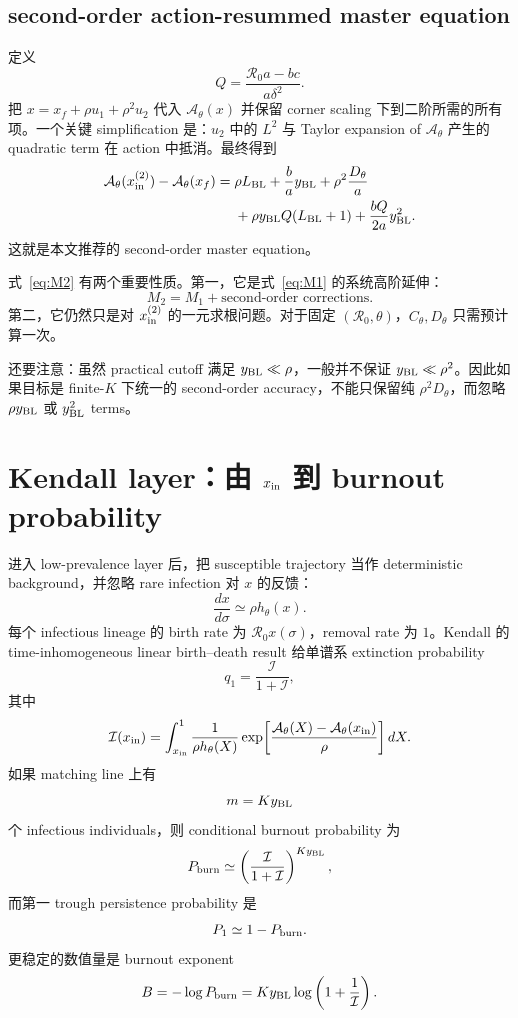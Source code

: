 \documentclass[11pt,a4paper]{ctexart}
\newcommand{\Rzero}{\mathcal R_0}
\newcommand{\Afun}{\mathcal A_\theta}
\newcommand{\BL}{y_{\rm BL}}
\newcommand{\xin}{x_{\rm in}}
\newcommand{\xf}{x_f}
\newcommand{\Pone}{P_1}
\newcommand{\Pburn}{P_{\rm burn}}
\begin{document}
\subsection{second-order action-resummed master equation}
定义
\begin{equation}
\label{eq:Q}
Q=\frac{\Rzero a-bc}{a\delta^2}.
\end{equation}
把 $x=\xf+\rho u_1+\rho^2u_2$ 代入 $\Afun(x)$ 并保留 corner scaling 下到二阶所需的所有项。一个关键 simplification 是：$u_2$ 中的 $L^2$ 与 Taylor expansion of $\Afun$ 产生的 quadratic term 在 action 中抵消。最终得到
\begin{equation}
\label{eq:M2}
\begin{split}
\Afun(x_{\rm in}^{(2)})-\Afun(\xf)
={}&\rho L_{\rm BL}
+\frac ba\BL
+\rho^2\frac{D_\theta}{a}\\
&+\rho\BL Q(L_{\rm BL}+1)
+\frac{bQ}{2a}\BL^2.
\end{split}
\end{equation}
这就是本文推荐的 second-order master equation。

式~\eqref{eq:M2} 有两个重要性质。第一，它是式~\eqref{eq:M1} 的系统高阶延伸：
\[
M_2=M_1+\text{second-order corrections}.
\]
第二，它仍然只是对 $x_{\rm in}^{(2)}$ 的一元求根问题。对于固定 $(\Rzero,\theta)$，$C_\theta,D_\theta$ 只需预计算一次。

还要注意：虽然 practical cutoff 满足 $\BL\ll\rho$，一般并不保证 $\BL\ll\rho^2$。因此如果目标是 finite-$K$ 下统一的 second-order accuracy，不能只保留纯 $\rho^2D_\theta$，而忽略 $\rho\BL$ 或 $\BL^2$ terms。

\section{Kendall layer：由 $x_{\rm in}$ 到 burnout probability}
进入 low-prevalence layer 后，把 susceptible trajectory 当作 deterministic background，并忽略 rare infection 对 $x$ 的反馈：
\[
\frac{dx}{d\sigma}\simeq\rho h_\theta(x).
\]
每个 infectious lineage 的 birth rate 为 $\Rzero x(\sigma)$，removal rate 为 $1$。Kendall 的 time-inhomogeneous linear birth--death result 给单谱系 extinction probability
\begin{equation}
\label{eq:q}
q_1=\frac{\mathcal I}{1+\mathcal I},
\end{equation}
其中
\begin{equation}
\label{eq:Kendall}
\mathcal I(\xin)
=\int_{\xin}^{1}
\frac1{\rho h_\theta(X)}
\exp\!\left[
\frac{\Afun(X)-\Afun(\xin)}{\rho}
\right]dX.
\end{equation}
如果 matching line 上有
\[
m=K\BL
\]
个 infectious individuals，则 conditional burnout probability 为
\begin{equation}
\label{eq:Pburn}
\Pburn
\simeq\left(\frac{\mathcal I}{1+\mathcal I}\right)^{K\BL},
\end{equation}
而第一 trough persistence probability 是
\begin{equation}
\label{eq:P1}
\Pone\simeq1-\Pburn.
\end{equation}
更稳定的数值量是 burnout exponent
\begin{equation}
\label{eq:B}
B=-\log\Pburn
=K\BL\log\left(1+\frac1{\mathcal I}\right).
\end{equation}
\end{document}
